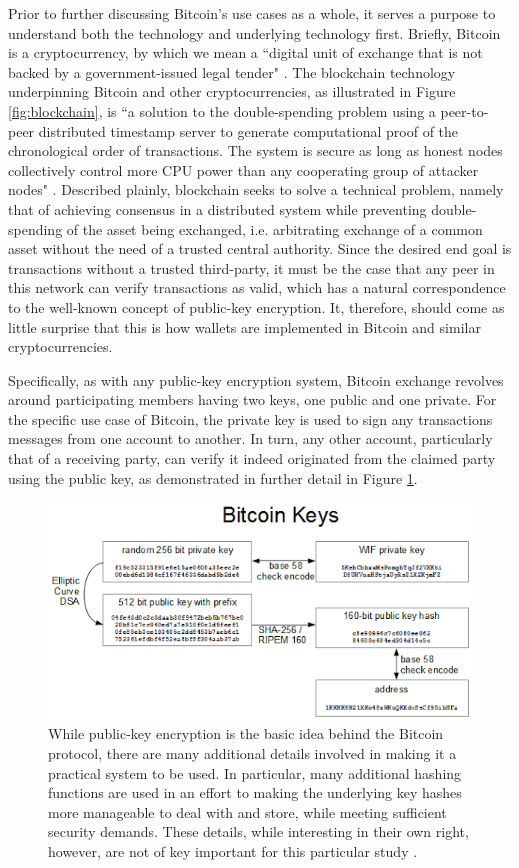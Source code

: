 \documentclass{article}
\begin{document}
Prior to further discussing Bitcoin's use cases as a whole, it serves a purpose to understand both the technology and underlying technology first. Briefly, Bitcoin is a cryptocurrency, by which we mean a ``digital unit of exchange that is not backed by a government-issued legal tender" \cite{virtual}. The blockchain technology underpinning Bitcoin and other cryptocurrencies, as illustrated in Figure \ref{fig:blockchain}, is ``a solution to the double-spending problem using a peer-to-peer distributed timestamp server to generate computational proof of the chronological order of transactions. The system is secure as long as honest nodes collectively control more CPU power than any cooperating group of attacker nodes" \cite{bitcoin}. Described plainly, blockchain seeks to solve a technical problem, namely that of achieving consensus in a distributed system while preventing double-spending of the asset being exchanged, i.e. arbitrating exchange of a common asset without the need of a trusted central authority. Since the desired end goal is transactions without a trusted third-party, it must be the case that any peer in this network can verify transactions as valid, which has a natural correspondence to the well-known concept of public-key encryption. It, therefore, should come as little surprise that this is how wallets are implemented in Bitcoin and similar cryptocurrencies.

Specifically, as with any public-key encryption system, Bitcoin exchange revolves around participating members having two keys, one public and one private. For the specific use case of Bitcoin, the private key is used to sign any transactions messages from one account to another. In turn, any other account, particularly that of a receiving party, can verify it indeed originated from the claimed party using the public key, as demonstrated in further detail in Figure \ref{fig:address}.

\begin{figure}
    \label{fig:address}
    \centering
    \includegraphics[width=.75\textwidth]{address.png}
    \caption[Bitcoin Public-Key Wallets]{While public-key encryption is the basic idea behind the Bitcoin protocol, there are many additional details involved in making it a practical system to be used. In particular, many additional hashing functions are used in an effort to making the underlying key hashes more manageable to deal with and store, while meeting sufficient security demands. These details, while interesting in their own right, however, are not of key important for this particular study \cite{public-key}.}
\end{figure}
\end{document}
